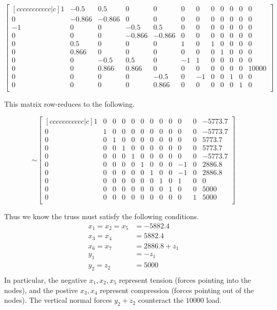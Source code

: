 \begin{applicationActivities}
\begin{observation}
\[
\begin{bmatrix}[ccccccccccc|c]
1&-0.5&0.5&0&0&0&0&0&0&0&0&0\\
0&-0.866&-0.866&0&0&0&0&0&0&0&0&0\\
-1&0&0&-0.5&0.5&0&0&0&0&0&0&0\\
0&0&0&-0.866&-0.866&0&0&0&0&0&0&0\\
0&0.5&0&0&0&1&0&1&0&0&0&0\\
0&0.866&0&0&0&0&0&0&1&0&0&0\\
0&0&-0.5&0.5&0&-1&1&0&0&0&0&0\\
0&0&0.866&0.866&0&0&0&0&0&0&0&10000\\
0&0&0&0&-0.5&0&-1&0&0&1&0&0\\
0&0&0&0&0.866&0&0&0&0&0&1&0\\
\end{bmatrix}
\]
\end{observation}

\begin{observation}
This matrix row-reduces to the following.


\[\sim
\begin{bmatrix}[ccccccccccc|c]
1&0&0&0&0&0&0&0&0&0&0&-5773.7\\
0&1&0&0&0&0&0&0&0&0&0&-5773.7\\
0&0&1&0&0&0&0&0&0&0&0&5773.7\\
0&0&0&1&0&0&0&0&0&0&0&5773.7\\
0&0&0&0&1&0&0&0&0&0&0&-5773.7\\
0&0&0&0&0&1&0&0&0&-1&0&2886.8\\
0&0&0&0&0&0&1&0&0&-1&0&2886.8\\
0&0&0&0&0&0&0&1&0&1&0&0\\
0&0&0&0&0&0&0&0&1&0&0&5000\\
0&0&0&0&0&0&0&0&0&0&1&5000\\
\end{bmatrix}
\]
\end{observation}
\begin{observation}
\drawtruss{\trussCompletion}

Thus we know the truss must satisfy the following conditions.
\begin{align*}
x_1=x_2=x_5&=-5882.4 \\
x_3=x_4&=5882.4\\
x_6=x_7&=2886.8+z_1\\
y_1&=-z_1\\
y_2=z_2&=5000 \\
\end{align*}
In particular, the negative \(x_1,x_2,x_5\) represent tension (forces pointing into the nodes),
and the postive \(x_3,x_4\) represent compression (forces pointing out of the nodes).
The vertical normal forces \(y_2+z_2\) counteract the \(10000\) load.

\end{observation}



\end{applicationActivities}
